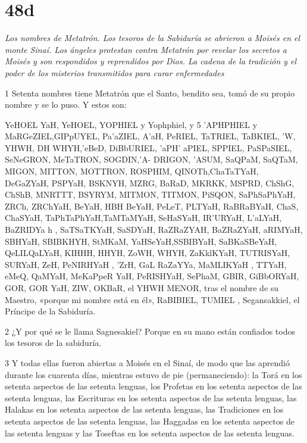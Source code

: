 \chapter{48d}

\par \textit{Los nombres de Metatrón. Los tesoros de la Sabiduría se abrieron a Moisés en el monte Sinaí. Los ángeles protestan contra Metatrón por revelar los secretos a Moisés y son respondidos y reprendidos por Dios. La cadena de la tradición y el poder de los misterios transmitidos para curar enfermedades}

\par 1 Setenta nombres tiene Metatrón que el Santo, bendito sea, tomó de su propio nombre y se lo puso. Y estos son:

\par YeHOEL YaH, YeHOEL, YOPHIEL y Yophphiel, y 5 'APHPHIEL y MaRGeZIEL,GIPpUYEL, Pa'aZIEL, A'aH, PeRIEL, TaTRIEL, TaBKIEL, 'W, YHWH, DH WHYH,'eBeD, DiBbURIEL, 'aPH' aPIEL, SPPIEL, PaSPaSIEL, SeNeGRON, MeTaTRON, SOGDIN,'A- DRIGON, 'ASUM, SaQPaM, SaQTaM, MIGON, MITTON, MOTTRON, ROSPHIM, QINOTh,ChaTaTYaH, DeGaZYaH, PSPYaH, BSKNYH, MZRG, BaRaD, MKRKK, MSPRD, ChShG, ChShB, MNRTTT, BSYRYM, MITMON, TITMON, PiSQON, SaPhSaPhYaH, ZRCh, ZRChYaH, BeYaH, HBH BeYaH, PeLeT, PLTYaH, RaBRaBYaH, ChaS, ChaSYaH, TaPhTaPhYaH,TaMTaMYaH, SeHaSYaH, IR'URYaH, L'aLYaH, BaZRIDYa h , SaTSaTKYaH, SaSDYaH, RaZRaZYAH, BaZRaZYaH, aRIMYaH, SBHYaH, SBIBKHYH, StMKaM, YaHSeYaH,SSBIBYaH, SaBKaSBeYaH, QeLILQaLYaH, KIHHH, HHYH, ZoWH, WHYH, ZaKklKYaH, TUTRISYaH, SURYaH, ZeH, PeNIRHYaH , 'ZrH, GaL RaZaYYa, MaMLIKYaH , TTYaH, eMeQ, QaMYaH, MeKaPpeR YaH, PeRISHYaH, SePhaM, GBIR, GiBbORYaH, GOR, GOR YaH, ZIW, OKBaR, el YHWH MENOR, tras el nombre de su Maestro, «porque mi nombre está en él», RaBIBIEL, TUMIEL , Segansakkiel, el Príncipe de la Sabiduría.

\par 2 ¿Y por qué se le llama Sagnesakiel? Porque en su mano están confiados todos los tesoros de la sabiduría.

\par 3 Y todas ellas fueron abiertas a Moisés en el Sinaí, de modo que las aprendió durante los cuarenta días, mientras estuvo de pie (permaneciendo): la Torá en los setenta aspectos de las setenta lenguas, los Profetas en los setenta aspectos de las setenta lenguas, las Escrituras en los setenta aspectos de las setenta lenguas, las Halakas en los setenta aspectos de las setenta lenguas, las Tradiciones en los setenta aspectos de las setenta lenguas, las Haggadas en los setenta aspectos de las setenta lenguas y las Toseftas en los setenta aspectos de las setenta lenguas.

